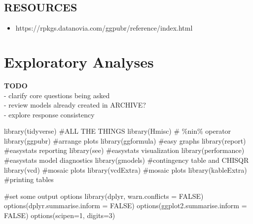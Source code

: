 \documentclass[
  letterpaper,
  DIV=11,
  numbers=noendperiod]{scrreprt}
\newenvironment{Shaded}{\begin{snugshade}}{\end{snugshade}}
\newcommand{\AttributeTok}[1]{\textcolor[rgb]{0.40,0.45,0.13}{#1}}
\newcommand{\CommentTok}[1]{\textcolor[rgb]{0.37,0.37,0.37}{#1}}
\newcommand{\ConstantTok}[1]{\textcolor[rgb]{0.56,0.35,0.01}{#1}}
\newcommand{\DecValTok}[1]{\textcolor[rgb]{0.68,0.00,0.00}{#1}}
\newcommand{\FunctionTok}[1]{\textcolor[rgb]{0.28,0.35,0.67}{#1}}
\newcommand{\NormalTok}[1]{\textcolor[rgb]{0.00,0.23,0.31}{#1}}
\providecommand{\tightlist}{%
  \setlength{\itemsep}{0pt}\setlength{\parskip}{0pt}}\usepackage{longtable,booktabs,array}
\begin{document}
\hypertarget{resources-3}{%
\section{RESOURCES}\label{resources-3}}

\begin{itemize}
\tightlist
\item
  https://rpkgs.datanovia.com/ggpubr/reference/index.html
\end{itemize}

\newpage

\hypertarget{sec-SGC3A-exploration}{%
\chapter{Exploratory Analyses}\label{sec-SGC3A-exploration}}

\textbf{TODO}\\
- clarify core questions being asked\\
- review models already created in ARCHIVE?\\
- explore response consistency

\begin{Shaded}
\begin{Highlighting}[]
\FunctionTok{library}\NormalTok{(tidyverse) }\CommentTok{\#ALL THE THINGS}
\FunctionTok{library}\NormalTok{(Hmisc) }\CommentTok{\# \%nin\% operator}
\FunctionTok{library}\NormalTok{(ggpubr) }\CommentTok{\#arrange plots}
\FunctionTok{library}\NormalTok{(ggformula) }\CommentTok{\#easy graphs}
\FunctionTok{library}\NormalTok{(report) }\CommentTok{\#easystats reporting}
\FunctionTok{library}\NormalTok{(see) }\CommentTok{\#easystats visualization}
\FunctionTok{library}\NormalTok{(performance) }\CommentTok{\#easystats model diagnostics}
\FunctionTok{library}\NormalTok{(gmodels) }\CommentTok{\#contingency table and CHISQR}
\FunctionTok{library}\NormalTok{(vcd) }\CommentTok{\#mosaic plots}
\FunctionTok{library}\NormalTok{(vcdExtra) }\CommentTok{\#mosaic plots}
\FunctionTok{library}\NormalTok{(kableExtra) }\CommentTok{\#printing tables }


\CommentTok{\#set some output options}
\FunctionTok{library}\NormalTok{(dplyr, }\AttributeTok{warn.conflicts =} \ConstantTok{FALSE}\NormalTok{)}
\FunctionTok{options}\NormalTok{(}\AttributeTok{dplyr.summarise.inform =} \ConstantTok{FALSE}\NormalTok{)}
\FunctionTok{options}\NormalTok{(}\AttributeTok{ggplot2.summarise.inform =} \ConstantTok{FALSE}\NormalTok{)}
\FunctionTok{options}\NormalTok{(}\AttributeTok{scipen=}\DecValTok{1}\NormalTok{, }\AttributeTok{digits=}\DecValTok{3}\NormalTok{)}
\end{Highlighting}
\end{Shaded}
\end{document}
